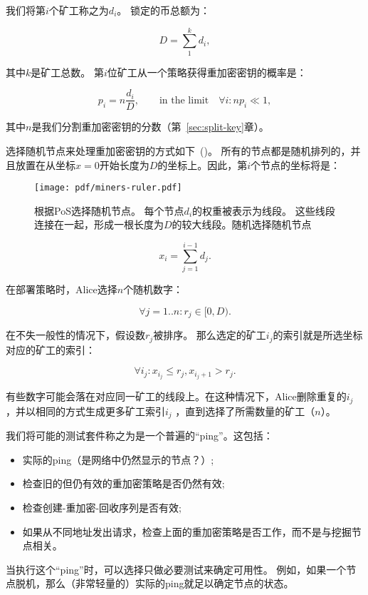 \documentclass[longbibliography,nofootinbib]{revtex4-1}
\begin{document}
\begin{CJK*}{UTF8}{gbsn}
    我们将第$i$个矿工称之为$d_i$。 锁定的币总额为：

\begin{equation}
    D = \sum_1^k d_i,
\end{equation}

其中$k$是矿工总数。 第$i$位矿工从一个策略获得重加密密钥的概率是：

\begin{equation}
    p_i = n\frac{d_i}{D},\qquad\text{in the limit}\quad \forall i: n p_i \ll 1,
\end{equation}

	其中$n$是我们分割重加密密钥的分数（第~\ref{sec:split-key}章）。

    选择随机节点来处理重加密密钥的方式如下~()。 所有的节点都是随机排列的，并且放置在从坐标$x=0$开始长度为$D$的坐标上。因此，第$i$个节点的坐标将是：
    
\begin{figure}
    \centering
    \texttt{[image: pdf/miners-ruler.pdf]}
    \caption{根据PoS选择随机节点。 每个节点$d_i$的权重被表示为线段。 这些线段连接在一起，形成一根长度为$D$的较大线段。随机选择随机节点}
    \label{fig:random-nodes}
\end{figure}
\begin{equation}
    x_i = \sum_{j=1}^{i-1} d_j.
\end{equation}

	在部署策略时，Alice选择$n$个随机数字：
    
\begin{equation}
    \forall j=1..n: r_j \in [0, D).
\end{equation}

	在不失一般性的情况下，假设数$r_j$被排序。 那么选定的矿工$i_j$的索引就是所选坐标对应的矿工的索引：

\begin{equation}
    \forall i_j: x_{i_j} \le r_j, x_{i_j + 1} > r_j.
\end{equation}

	有些数字可能会落在对应同一矿工的线段上。在这种情况下，Alice删除重复的$i_j$ ，并以相同的方式生成更多矿工索引$i_j$ ，直到选择了所需数量的矿工（$n$）。

	我们将可能的测试套件称之为是一个普遍的“ping”。这包括：
\begin{itemize}
    \item 实际的ping（是网络中仍然显示的节点？）;
    \item 检查旧的但仍有效的重加密策略是否仍然有效;
    \item 检查创建-重加密-回收序列是否有效;
    \item 如果从不同地址发出请求，检查上面的重加密策略是否工作，而不是与挖掘节点相关。
\end{itemize}
	当执行这个“ping”时，可以选择只做必要测试来确定可用性。 例如，如果一个节点脱机，那么（非常轻量的）实际的ping就足以确定节点的状态。
    

\end{CJK*}
\end{document}
